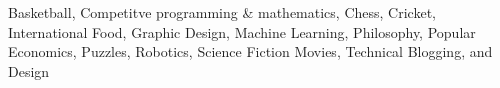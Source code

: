 
{%
	Basketball, Competitve programming \& mathematics, Chess, Cricket, International Food, Graphic Design, Machine Learning, Philosophy, Popular Economics, Puzzles, Robotics, Science Fiction Movies, Technical Blogging, and  Design
}
